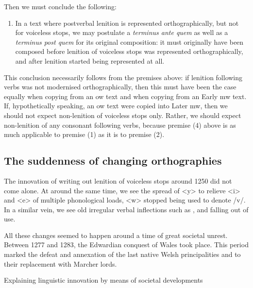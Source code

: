 Then we must conclude the following:
\begin{enumerate}
\item In a text where postverbal lenition is represented orthographically, but not for voiceless stops, we may postulate a \textit{terminus ante quem} as well as a \textit{terminus post quem} for its original composition: it must originally have been composed before lenition of voiceless stops was represented orthographically, and after lenition started being represented at all.
\end{enumerate}

This conclusion necessarily follows from the premises above: if lenition following verbs was not modernised orthographically, then this must have been the case equally when copying from an \gls{ow} text and when copying from an Early \gls{mw} text. If, hypothetically speaking, an \gls{ow} text were copied into Later \gls{mw}, then we should not expect non-lenition of voiceless stops only. Rather, we should expect non-lenition of any consonant following verbs, because premise (4) above is as much applicable to premise (1) as it is to premise (2).


\subsection{The suddenness of changing orthographies}
The innovation of writing out lenition of voiceless stops around 1250 did not come alone. At around the same time, we see the spread of <y> to relieve <i> and <e> of multiple phonological loads, <w> stopped being used to denote /v/. In a similar vein, we see old irregular verbal inflections such as ,  and  falling out of use.

All these changes seemed to happen around a time of great societal unrest. Between 1277 and 1283, the Edwardian conquest of Wales took place. This period marked the defeat and annexation of the last native Welsh principalities and to their replacement with Marcher lords.

Explaining linguistic innovation by means of societal developments 

